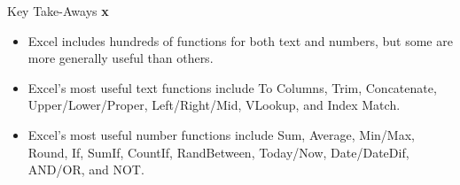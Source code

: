 %
%

\begin{center}
	\begin{tkwbox}{Key Take-Aways}
		\textbf{x}
		\\
		\begin{itemize}
			\setlength{\itemsep}{0pt}
			\setlength{\parskip}{0pt}
			\setlength{\parsep}{0pt}
			
			\item Excel includes hundreds of functions for both text and numbers, but some are more generally useful than others.  
			\item Excel's most useful text functions include To Columns, Trim, Concatenate, Upper/Lower/Proper, Left/Right/Mid, VLookup, and Index Match.
			\item Excel's most useful number functions include Sum, Average, Min/Max, Round, If, SumIf, CountIf, RandBetween, Today/Now, Date/DateDif, AND/OR, and NOT.
			
		\end{itemize}
	\end{tkwbox}
\end{center}


